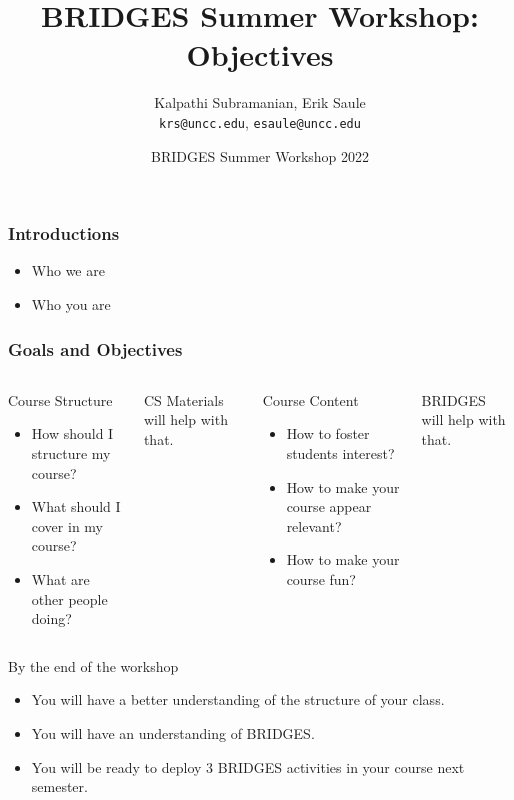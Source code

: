 \documentclass[aspectratio=169]{beamer}
\title[Objectives]{BRIDGES Summer Workshop:\\Objectives}
\subtitle{}
\author{Kalpathi Subramanian, Erik Saule\\\texttt{krs@uncc.edu}, \texttt{esaule@uncc.edu}}
\institute{The University of North Carolina at Charlotte}
\date{BRIDGES Summer Workshop 2022}
\begin{document}
\begin{frame}
\titlepage

\end{frame}


\begin{frame}
  \frametitle{Introductions}

  \begin{itemize}
  \item Who we are
  \item Who you are
  \end{itemize}
\end{frame}

\begin{frame}
  \frametitle{Goals and Objectives}

  \begin{columns}
    \begin{block}{Course Structure}
      \begin{itemize}
      \item How should I structure my course?
      \item What should I cover in my course?
      \item What are other people doing?
      \end{itemize}
    \end{block}

    CS Materials will help with that.
    
    \begin{block}{Course Content}
      \begin{itemize}
      \item How to foster students interest?
      \item How to make your course appear relevant?
      \item How to make your course fun?
      \end{itemize}
    \end{block}

   BRIDGES will help with that.
  \end{columns}

  \begin{block}{By the end of the workshop}
    \begin{itemize}
    \item You will have a better understanding of the structure of your class.
    \item You will have an understanding of BRIDGES.
    \item You will be ready to deploy 3 BRIDGES activities in your course next semester.
    \end{itemize}
  \end{block}

  
\end{frame}
\end{document}
